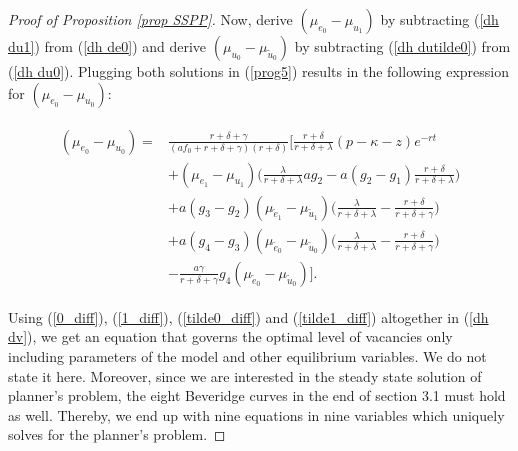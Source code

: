 \documentclass[12pt]{article} %
\theoremstyle{definition}
\begin{document}
\begin{proof}[Proof of Proposition \ref{prop SSPP}]
Now, derive $(\mu_{e_0}-\mu_{u_1})$ by subtracting (\ref{dh du1}) from (\ref{dh de0}) and derive $(\mu_{u_0}-\mu_{\tilde{u}_0})$ by subtracting (\ref{dh dutilde0}) from (\ref{dh du0}). Plugging both solutions in (\ref{prog5}) results in the following expression for $(\mu_{e_0}-\mu_{u_0})$:

\begin{fleqn}
\begin{align}
\begin{split}
 (\mu_{e_0}-\mu_{u_0}) =& \frac{r+\delta+\gamma}{(af_0+r+\delta+\gamma)(r+\delta)}\Biggl[\frac{r+\delta}{r+\delta+\lambda}(p-\kappa-z)e^{-rt} \\
& +(\mu_{e_1}-\mu_{u_1})\biggl(\frac{\lambda}{r+\delta+\lambda}ag_2-a(g_2-g_1)\frac{r+\delta}{r+\delta+\lambda}\biggr)\\
& +a(g_3-g_2)(\mu_{\tilde{e}_1}-\mu_{\tilde{u}_1})\biggl(\frac{\lambda}{r+\delta+\lambda}-\frac{r+\delta}{r+\delta+\gamma}\biggr) \\
& + a(g_4-g_3)(\mu_{\tilde{e}_0}-\mu_{\tilde{u}_0})\biggl(\frac{\lambda}{r+\delta+\lambda}-\frac{r+\delta}{r+\delta+\gamma}\biggr)\\
& -\frac{a\gamma}{r+\delta+\gamma}g_4(\mu_{\tilde{e}_0}-\mu_{\tilde{u}_0}) \Biggr]. \label{0_diff}
\end{split}
\end{align}
\end{fleqn}
Using (\ref{0_diff}), (\ref{1_diff}), (\ref{tilde0_diff}) and (\ref{tilde1_diff}) altogether in (\ref{dh dv}), we get an equation that governs the optimal level of vacancies only including parameters of the model and other equilibrium variables. We do not state it here. Moreover, since we are interested in the steady state solution of planner's problem, the eight Beveridge curves in the end of section 3.1 must hold as well. Thereby, we end up with nine equations in nine variables which uniquely solves for the planner's problem.
\end{proof}
\end{document}
